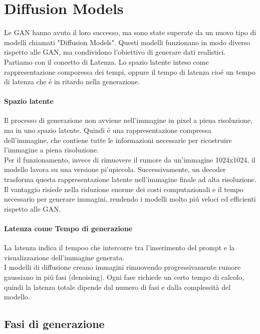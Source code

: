 \section{Diffusion Models}
Le GAN hanno avuto il loro successo, ma sono state superate da un nuovo tipo di modelli chiamati "Diffusion Models". Questi modelli funzionano in modo diverso rispetto alle GAN, ma condividono l'obiettivo di generare dati realistici.\\

Partiamo con il concetto di Latenza. Lo spazio latente inteso come rappresentazione comporessa dei tempi, oppure il tempo di latenza cioé un tempo di latenza che é in ritardo nella generazione.

\paragraph{Spazio latente}
Il processo di generazione non avviene nell'immagine in pixel a piena risoluzione, ma in uno spazio latente. Quindi é una rappresentazione compressa dell'immagine, che contiene tutte le informazioni necessarie per ricostruire l'immagine a piena risoluzione.\\

Per il funzionamento, invece di rimuovere il rumore da un'immagine 1024x1024, il modello lavora su una versione pi'upiccola. Successivamente, un decoder trasforma questa rappresentazione latente nell'immagine finale ad alta risoluzione.\\

Il vantaggio risiede nella riduzione enorme dei costi computazionali e il tempo necessario per generare immagini, rendendo i modelli molto piú veloci ed efficienti rispetto alle GAN.\\

\paragraph{Latenza come Tempo di generazione}
La latenza indica il tempoo che intercorre tra l'inserimento del prompt e la visualizzazione dell'immagine generata.\\
I modelli di diffusione creano immagini rimuovendo progressivamente rumore gaussiano in piú fasi (denoising). Ogni fase richiede un certo tempo di calcolo, quindi la latenza totale dipende dal numero di fasi e dalla complessità del modello.\\

\subsection{Fasi di generazione}
